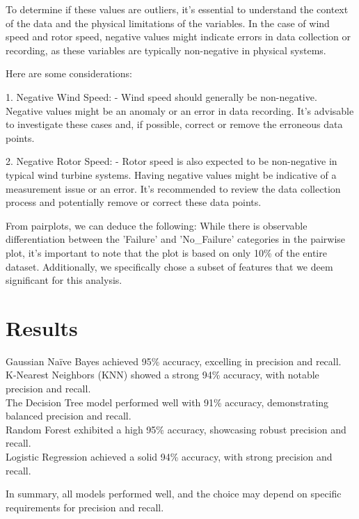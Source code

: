 \documentclass[11pt,a4paper]{article}
\begin{document}
To determine if these values are outliers, it's essential to understand the context of the data and the physical limitations of the variables. In the case of wind speed and rotor speed, negative values might indicate errors in data collection or recording, as these variables are typically non-negative in physical systems.

Here are some considerations:

1. Negative Wind Speed:
   - Wind speed should generally be non-negative. Negative values might be an anomaly or an error in data recording. It's advisable to investigate these cases and, if possible, correct or remove the erroneous data points.

2. Negative Rotor Speed:
   - Rotor speed is also expected to be non-negative in typical wind turbine systems. Having negative values might be indicative of a measurement issue or an error. It's recommended to review the data collection process and potentially remove or correct these data points.

From pairplots, we can deduce the following: While there is observable differentiation between the 'Failure' and 'No\_Failure' categories in the pairwise plot, it's important to note that the plot is based on only 10\% of the entire dataset. Additionally, we specifically chose a subset of features that we deem significant for this analysis.

\section{Results}

\noindent
Gaussian Naïve Bayes achieved 95\% accuracy, excelling in precision and recall. \\
K-Nearest Neighbors (KNN) showed a strong 94\% accuracy, with notable precision and recall. \\
The Decision Tree model performed well with 91\% accuracy, demonstrating balanced precision and recall. \\

Random Forest exhibited a high 95\% accuracy, showcasing robust precision and recall. \\
Logistic Regression achieved a solid 94\% accuracy, with strong precision and recall.

\noindent
In summary, all models performed well, and the choice may depend on specific requirements for precision and recall.
\end{document}
